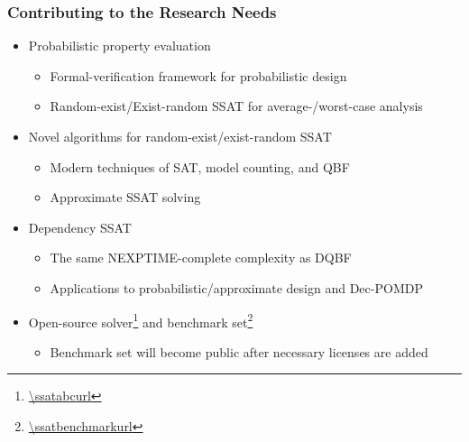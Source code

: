 \begin{frame}
      \frametitle{Contributing to the Research Needs}
      \begin{itemize}
            \item Probabilistic property evaluation
                  \pause
                  \begin{itemize}
                        \item Formal-verification framework for probabilistic design
                              \pause
                        \item Random-exist/Exist-random SSAT for average-/worst-case analysis
                              \pause
                  \end{itemize}
            \item Novel algorithms for random-exist/exist-random SSAT
                  \pause
                  \begin{itemize}
                        \item Modern techniques of SAT, model counting, and QBF
                              \pause
                        \item Approximate SSAT solving
                              \pause
                  \end{itemize}
            \item Dependency SSAT
                  \pause
                  \begin{itemize}
                        \item The same NEXPTIME-complete complexity as DQBF
                              \pause
                        \item Applications to probabilistic/approximate design and Dec-POMDP
                              \pause
                  \end{itemize}
            \item Open-source solver\footnote{\url{\ssatabcurl}} and benchmark set\footnote{\url{\ssatbenchmarkurl}}
                  \pause
                  \begin{itemize}
                        \item Benchmark set will become public after necessary licenses are added
                  \end{itemize}
      \end{itemize}
\end{frame}